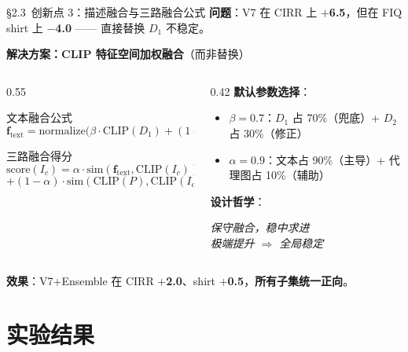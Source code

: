 \documentclass[aspectratio=169,12pt]{beamer}
\newcommand{\up}[1]{\textcolor{tongjiRed}{\textbf{$+$#1}}}
\newcommand{\down}[1]{\textcolor{tongjiGreen}{\textbf{$-$#1}}}
\begin{document}
\begin{frame}{\S2.3~创新点 3：描述融合与三路融合公式}
\textbf{问题}：V7 在 CIRR 上 {\up{6.5}}，但在 FIQ shirt 上 {\down{4.0}} —— 直接替换 $D_1$ 不稳定。

\vspace{0.8em}
\textbf{解决方案：CLIP 特征空间加权融合}（而非替换）

\begin{columns}[T]
\begin{column}{0.55\textwidth}
\begin{block}{文本融合公式}
\small
\[
\mathbf{f}_{\text{text}} = \mathrm{normalize}\big(\beta \cdot \mathrm{CLIP}(D_1) + (1-\beta) \cdot \mathrm{CLIP}(D_2)\big)
\]
\end{block}

\begin{block}{三路融合得分}
\small
\[
\mathrm{score}(I_c) = \alpha \cdot \mathrm{sim}(\mathbf{f}_{\text{text}}, \mathrm{CLIP}(I_c))
\]
\[
+ (1-\alpha) \cdot \mathrm{sim}(\mathrm{CLIP}(P), \mathrm{CLIP}(I_c))
\]
\end{block}
\end{column}
\begin{column}{0.42\textwidth}
\textbf{默认参数选择}：
\begin{itemize}\small
  \item $\beta = 0.7$：$D_1$ 占 70\%（兜底）+ $D_2$ 占 30\%（修正）
  \item $\alpha = 0.9$：文本占 90\%（主导）+ 代理图占 10\%（辅助）
\end{itemize}

\vspace{0.5em}
\textbf{设计哲学}：
\begin{center}\small
\textit{保守融合，稳中求进}\\
\textit{极端提升 $\Rightarrow$ 全局稳定}
\end{center}
\end{column}
\end{columns}

\vspace{0.3em}
\begin{center}\small
\textbf{效果}：V7+Ensemble 在 CIRR {\up{2.0}}、shirt {\up{0.5}}，\textbf{所有子集统一正向}。
\end{center}
\end{frame}

\section{实验结果}
\end{document}
